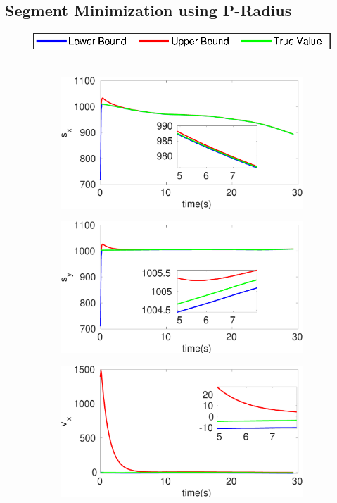 \clearpage
\subsection{Segment Minimization using P-Radius}
\FloatBarrier
\begin{figure}[h]
\hspace*{\fill} \includegraphics[scale=0.8]{figures/legend}\\\\
\begin{subfigure}{.5\linewidth}
\centering
\includegraphics[width=\linewidth]{figures/Prad/s3cvprads_x}
\end{subfigure}
\begin{subfigure}{.5\linewidth}
\centering
\includegraphics[width=\linewidth]{figures/Prad/s3cvprads_y}
\end{subfigure}
\begin{subfigure}{.5\linewidth}
\centering
\includegraphics[width=\linewidth]{figures/Prad/s3cvpradv_x}

\end{subfigure}
\end{figure}
